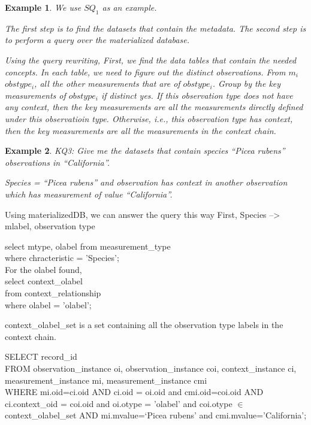 \documentclass[conference]{IEEEtran}
\newtheorem{example}{Example}[section]
\begin{document}
\begin{example}
We use $SQ_1$ as an example. 

The first step is to find the datasets that contain the metadata. 
The second step is to perform a query over the materialized database. 

Using the query rewriting, 
First, we find the data tables that contain the needed concepts. 
In each table, we need to figure out the distinct observations. 
From $m_i$ $obstype_i$, all the other measurements that are of
$obstype_i$. 
Group by the key measurements of $obstype_i$ if distinct yes.
If this observation type does not have any context, then the key
measurements are all the measurements directly defined under this
observatioin type. Otherwise, i.e., this observation type has context,
then the key measurements are all the measurements in the context
chain. 
\end{example}

\begin{example}
KQ3: Give me the datasets that contain species ``Picea rubens''
  observations in ``California''. 

Species = ``Picea rubens'' and observation has context {\em in}
another observation which has measurement of value ``California''. 
\end{example}

Using materializedDB, we can answer the query this way
First, Species --> mlabel, observation type 

select mtype, olabel from measurement\_type  \\
where chracteristic = 'Species';  \\

For the olabel found, \\
select context\_olabel\\
from context\_relationship\\
where olabel = 'olabel'; 

context\_olabel\_set is a set containing all the observation type
labels in the context chain. 

SELECT record\_id\\
FROM observation\_instance oi, observation\_instance coi,
context\_instance ci,
measurement\_instance mi, measurement\_instance cmi \\
WHERE mi.oid=ci.oid AND ci.oid = oi.oid and  cmi.oid=coi.oid AND ci.context\_oid =
coi.oid and oi.otype = 'olabel' and coi.otype $\in$
context\_olabel\_set
AND mi.mvalue=`Picea rubens' and cmi.mvalue='California';\\
\end{document}
